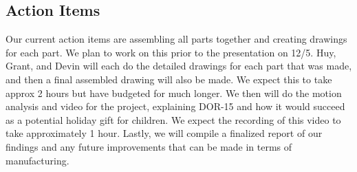 \begin{table}[H]
    \begin{center}
    \end{center}
    \caption{Project Schedule as of \today}
    \label{tab:table1}
\end{table}

\subsection{Action Items}

    Our current action items are assembling all parts together and creating drawings for each part. We plan to work on this prior to the presentation on 12/5. Huy, Grant, and Devin will each do the detailed drawings for each part that was made, and then a final assembled drawing will also be made. We expect this to take approx 2 hours but have budgeted for much longer. We then will do the motion analysis and video for the project, explaining DOR-15 and how it would succeed as a potential holiday gift for children. We expect the recording of this video to take approximately 1 hour. Lastly, we will compile a finalized report of our findings and any future improvements that can be made in terms of manufacturing.


